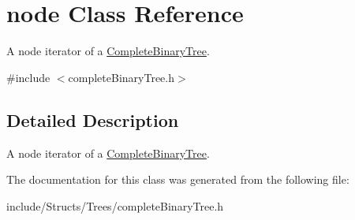 \hypertarget{classnode}{
\section{node Class Reference}
\label{classnode}
}


A node iterator of a \hyperlink{class_complete_binary_tree}{CompleteBinaryTree}.  




{\ttfamily \#include $<$completeBinaryTree.h$>$}



\subsection{Detailed Description}
A node iterator of a \hyperlink{class_complete_binary_tree}{CompleteBinaryTree}. 

The documentation for this class was generated from the following file:\begin{DoxyCompactItemize}
\item 
include/Structs/Trees/completeBinaryTree.h\end{DoxyCompactItemize}
